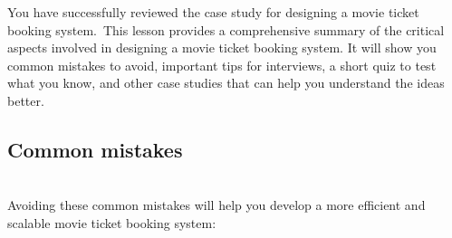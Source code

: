 

You have successfully reviewed the case study for designing a movie ticket booking system.~This lesson provides a comprehensive summary of the critical aspects involved in designing a movie ticket booking system. It will show you common mistakes to avoid, important tips for interviews, a short quiz to test what you know, and other case studies that can help you understand the ideas better.

\subsection{Common mistakes}\label{M31WCwtPLyUQY2EUJAS8v}
\\
Avoiding these common mistakes will help you develop a more efficient and scalable movie ticket booking system:

